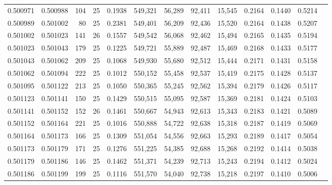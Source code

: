 \begin{tabular}{rrrrrrrrrrrrr}
0.500971 & 0.500988 & 104 &  25 &                                     0.1938 & 549,321 &  56,289 &  92,411 &  15,545 & 0.2164 & 0.1440 & 0.5214 \\
0.500989 & 0.501002 &  80 &  25 &                                     0.2381 & 549,401 &  56,209 &  92,436 &  15,520 & 0.2164 & 0.1438 & 0.5207 \\
0.501002 & 0.501023 & 141 &  26 &                                     0.1557 & 549,542 &  56,068 &  92,462 &  15,494 & 0.2165 & 0.1435 & 0.5194 \\
0.501023 & 0.501043 & 179 &  25 &                                     0.1225 & 549,721 &  55,889 &  92,487 &  15,469 & 0.2168 & 0.1433 & 0.5177 \\
0.501043 & 0.501062 & 209 &  25 &                                     0.1068 & 549,930 &  55,680 &  92,512 &  15,444 & 0.2171 & 0.1431 & 0.5158 \\
0.501062 & 0.501094 & 222 &  25 &                                     0.1012 & 550,152 &  55,458 &  92,537 &  15,419 & 0.2175 & 0.1428 & 0.5137 \\
0.501095 & 0.501122 & 213 &  25 &                                     0.1050 & 550,365 &  55,245 &  92,562 &  15,394 & 0.2179 & 0.1426 & 0.5117 \\
0.501123 & 0.501141 & 150 &  25 &                                     0.1429 & 550,515 &  55,095 &  92,587 &  15,369 & 0.2181 & 0.1424 & 0.5103 \\
0.501141 & 0.501152 & 152 &  26 &                                     0.1461 & 550,667 &  54,943 &  92,613 &  15,343 & 0.2183 & 0.1421 & 0.5089 \\
0.501152 & 0.501164 & 221 &  25 &                                     0.1016 & 550,888 &  54,722 &  92,638 &  15,318 & 0.2187 & 0.1419 & 0.5069 \\
0.501164 & 0.501173 & 166 &  25 &                                     0.1309 & 551,054 &  54,556 &  92,663 &  15,293 & 0.2189 & 0.1417 & 0.5054 \\
0.501173 & 0.501179 & 171 &  25 &                                     0.1276 & 551,225 &  54,385 &  92,688 &  15,268 & 0.2192 & 0.1414 & 0.5038 \\
0.501179 & 0.501186 & 146 &  25 &                                     0.1462 & 551,371 &  54,239 &  92,713 &  15,243 & 0.2194 & 0.1412 & 0.5024 \\
0.501186 & 0.501199 & 199 &  25 &                                     0.1116 & 551,570 &  54,040 &  92,738 &  15,218 & 0.2197 & 0.1410 & 0.5006 \\

\end{tabular}
